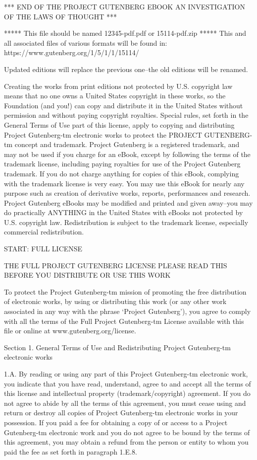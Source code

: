 \documentclass[oneside]{book}
\begin{document}
\begin{text}
*** END OF THE PROJECT GUTENBERG EBOOK AN INVESTIGATION OF THE LAWS OF THOUGHT ***

***** This file should be named 12345-pdf.pdf or 15114-pdf.zip *****
This and all associated files of various formats will be found in:
    https://www.gutenberg.org/1/5/1/1/15114/

Updated editions will replace the previous one--the old editions will
be renamed.

Creating the works from print editions not protected by U.S. copyright
law means that no one owns a United States copyright in these works,
so the Foundation (and you!) can copy and distribute it in the
United States without permission and without paying copyright
royalties. Special rules, set forth in the General Terms of Use part
of this license, apply to copying and distributing Project
Gutenberg-tm electronic works to protect the PROJECT GUTENBERG-tm
concept and trademark. Project Gutenberg is a registered trademark,
and may not be used if you charge for an eBook, except by following
the terms of the trademark license, including paying royalties for use
of the Project Gutenberg trademark. If you do not charge anything for
copies of this eBook, complying with the trademark license is very
easy. You may use this eBook for nearly any purpose such as creation
of derivative works, reports, performances and research. Project
Gutenberg eBooks may be modified and printed and given away--you may
do practically ANYTHING in the United States with eBooks not protected
by U.S. copyright law. Redistribution is subject to the trademark
license, especially commercial redistribution.

START: FULL LICENSE

THE FULL PROJECT GUTENBERG LICENSE
PLEASE READ THIS BEFORE YOU DISTRIBUTE OR USE THIS WORK

To protect the Project Gutenberg-tm mission of promoting the free
distribution of electronic works, by using or distributing this work
(or any other work associated in any way with the phrase `Project
Gutenberg'), you agree to comply with all the terms of the Full
Project Gutenberg-tm License available with this file or online at
www.gutenberg.org/license.

Section 1. General Terms of Use and Redistributing Project
Gutenberg-tm electronic works

1.A. By reading or using any part of this Project Gutenberg-tm
electronic work, you indicate that you have read, understand, agree to
and accept all the terms of this license and intellectual property
(trademark/copyright) agreement. If you do not agree to abide by all
the terms of this agreement, you must cease using and return or
destroy all copies of Project Gutenberg-tm electronic works in your
possession. If you paid a fee for obtaining a copy of or access to a
Project Gutenberg-tm electronic work and you do not agree to be bound
by the terms of this agreement, you may obtain a refund from the
person or entity to whom you paid the fee as set forth in paragraph
1.E.8.


\end{text}
\end{document}
